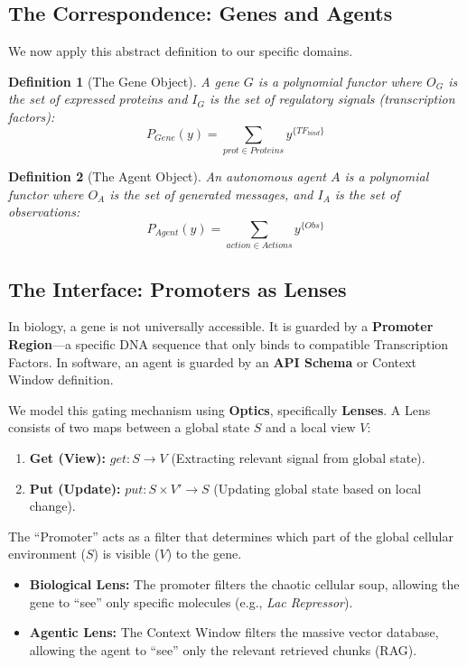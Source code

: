 \documentclass[11pt, a4paper]{article}
\newtheorem{definition}{Definition}
\begin{document}
\subsection{The Correspondence: Genes and Agents}
We now apply this abstract definition to our specific domains.

\begin{definition}[The Gene Object]
A gene $G$ is a polynomial functor where $O_G$ is the set of expressed proteins and $I_G$ is the set of regulatory signals (transcription factors):
\begin{equation}
    P_{Gene}(y) = \sum_{prot \in Proteins} y^{\{TF_{bind}\}}
\end{equation}
\end{definition}

\begin{definition}[The Agent Object]
An autonomous agent $A$ is a polynomial functor where $O_A$ is the set of generated messages, and $I_A$ is the set of observations:
\begin{equation}
    P_{Agent}(y) = \sum_{action \in Actions} y^{\{Obs\}}
\end{equation}
\end{definition}


\subsection{The Interface: Promoters as Lenses}

In biology, a gene is not universally accessible. It is guarded by a \textbf{Promoter Region}---a specific DNA sequence that only binds to compatible Transcription Factors. In software, an agent is guarded by an \textbf{API Schema} or Context Window definition.

We model this gating mechanism using \textbf{Optics}, specifically \textbf{Lenses}. A Lens consists of two maps between a global state $S$ and a local view $V$:
\begin{enumerate}
    \item \textbf{Get (View):} $get: S \to V$ (Extracting relevant signal from global state).
    \item \textbf{Put (Update):} $put: S \times V' \to S$ (Updating global state based on local change).
\end{enumerate}

The ``Promoter'' acts as a filter that determines which part of the global cellular environment ($S$) is visible ($V$) to the gene.
\begin{itemize}
    \item \textbf{Biological Lens:} The promoter filters the chaotic cellular soup, allowing the gene to ``see'' only specific molecules (e.g., \textit{Lac Repressor}).
    \item \textbf{Agentic Lens:} The Context Window filters the massive vector database, allowing the agent to ``see'' only the relevant retrieved chunks (RAG).
\end{itemize}
\end{document}
